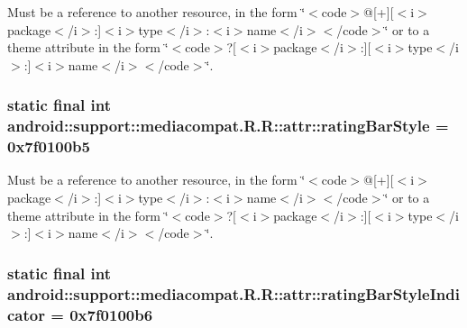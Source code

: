 Must be a reference to another resource, in the form \char`\"{}$<$code$>$@\mbox{[}+\mbox{]}\mbox{[}$<$i$>$package$<$/i$>$:\mbox{]}$<$i$>$type$<$/i$>$:$<$i$>$name$<$/i$>$$<$/code$>$\char`\"{} or to a theme attribute in the form \char`\"{}$<$code$>$?\mbox{[}$<$i$>$package$<$/i$>$:\mbox{]}\mbox{[}$<$i$>$type$<$/i$>$:\mbox{]}$<$i$>$name$<$/i$>$$<$/code$>$\char`\"{}. \hypertarget{classandroid_1_1support_1_1mediacompat_1_1_r_1_1attr_edcaeee8fdb8d383e047039a906e378e}{
\subsubsection[{ratingBarStyle}]{\setlength{\rightskip}{0pt plus 5cm}static final int android::support::mediacompat.R.R::attr::ratingBarStyle = 0x7f0100b5}}
\label{classandroid_1_1support_1_1mediacompat_1_1_r_1_1attr_edcaeee8fdb8d383e047039a906e378e}


Must be a reference to another resource, in the form \char`\"{}$<$code$>$@\mbox{[}+\mbox{]}\mbox{[}$<$i$>$package$<$/i$>$:\mbox{]}$<$i$>$type$<$/i$>$:$<$i$>$name$<$/i$>$$<$/code$>$\char`\"{} or to a theme attribute in the form \char`\"{}$<$code$>$?\mbox{[}$<$i$>$package$<$/i$>$:\mbox{]}\mbox{[}$<$i$>$type$<$/i$>$:\mbox{]}$<$i$>$name$<$/i$>$$<$/code$>$\char`\"{}. \hypertarget{classandroid_1_1support_1_1mediacompat_1_1_r_1_1attr_8e950a1e761bc7f19f44c4e43d190485}{
\subsubsection[{ratingBarStyleIndicator}]{\setlength{\rightskip}{0pt plus 5cm}static final int android::support::mediacompat.R.R::attr::ratingBarStyleIndicator = 0x7f0100b6}}
\label{classandroid_1_1support_1_1mediacompat_1_1_r_1_1attr_8e950a1e761bc7f19f44c4e43d190485}


